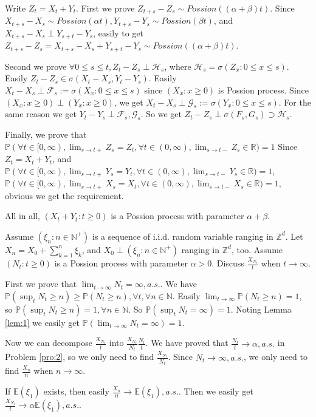 \documentclass[../main]{subfiles}
\begin{document}
\begin{solution}
  Write \(Z_t=X_t + Y_t\). First we prove \(Z_{t+s}-Z_s \sim Possion((\alpha + \beta)t)\).
  Since \(X_{t + s}-X_s \sim Possion(\alpha t),Y_{t+s}-Y_s \sim Possion(\beta t)\), and \(X_{t + s}-X_s \perp Y_{s + t}-Y_s\), easily to get
  \(Z_{t + s}-Z_{s}=X_{t + s}-X_s+Y_{s + t}-Y_s \sim Possion((\alpha + \beta)t)\).

  Second we prove \(\forall 0 \leq s \leq t,Z_t-Z_s \perp \mathcal{H}_s\), where \(\mathcal{H}_s =\sigma(Z_x:0 \leq x \leq s)\).
  Easily \(Z_t-Z_s \in \sigma(X_t-X_s,Y_t-Y_s)\).
  Easily \(X_t-X_s \perp \mathcal{F}_s:=\sigma(X_x:0 \leq x \leq s)\) since \((X_x:x \geq 0)\) is Possion process.
  Since \((X_x:x \geq 0)\perp (Y_x:x \geq 0)\), we get \(X_t-X_s \perp \mathcal{G}_s:=\sigma(Y_x:0 \leq x \leq s)\).
  For the same reason we get \(Y_t-Y_s \perp \mathcal{F}_s,\mathcal{G}_s\).
  So we get \(Z_t-Z_s \perp \sigma(F_s,G_s) \supset \mathcal{H}_s\).

  Finally, we prove that \(\mathbb{P}(\forall t \in [0,\infty),\lim_{s \to t+}Z_s =Z_t,\forall t \in (0,\infty),\lim_{s \to t-}Z_s \in \mathbb{R})=1\)
  Since \(Z_t=X_t + Y_t\), and
  \(\mathbb{P}(\forall t \in [0,\infty),\lim_{s \to t+}Y_s =Y_t,\forall t \in (0,\infty),\lim_{s \to t-}Y_s \in \mathbb{R})=1\),
  \(\mathbb{P}(\forall t \in [0,\infty),\lim_{s \to t+}X_s =X_t,\forall t \in (0,\infty),\lim_{s \to t-}X_s \in \mathbb{R})=1\),
  obvious we get the requirement.

  All in all, \((X_t + Y_t:t \geq 0)\) is a Possion process with parameter \(\alpha + \beta\).
\end{solution}
\begin{problem}\label{pro:5}
  Assume \((\xi_n:n \in \mathbb{N}^+)\) is a sequence of i.i.d. random variable ranging in \(\mathbb{Z}^d\).
  Let \(X_n=X_0 + \sum_{k=1}^{n}\xi_k\), and \(X_0 \perp (\xi_n:n \in \mathbb{N}^+)\) ranging in \(\mathbb{Z}^d\), too.
  Assume \((N_t:t \geq 0)\) is a Possion process with parameter \(\alpha>0\).
  Discuss \(\frac{X_{N_t}}{t}\) when \(t \to \infty\).
\end{problem}
\begin{solution}
  First we prove that \(\lim_{t \to \infty}N_t=\infty,a. s.\).
  We have \(\mathbb{P}(\sup_{t}N_t \geq n)\geq \mathbb{P}(N_t \geq n),\forall t ,\forall n \in \mathbb{N}\).
  Easily \(\lim_{t \to \infty}\mathbb{P}(N_t \geq n)=1\), so \(\mathbb{P}(\sup_{t}N_t \geq n)=1,\forall n \in \mathbb{N}\).
  So \(\mathbb{P}(\sup_{t}N_t=\infty)=1\).
  Noting Lemma \ref{lem:1} we easily get \(\mathbb{P}(\lim_{t \to \infty}N_t = \infty)=1\).

  Now we can decompose \(\frac{X_{N_t}}{t}\) into \(\frac{X_{N_t}}{N_t} \frac{N_t}{t}\).
  We have proved that \(\frac{N_t}{t} \to \alpha,a. s.\) in Problem \ref{pro:2}, so we only need to find \(\frac{X_{N_t}}{N_t}\).
  Since \(N_t \to \infty,a. s.\), we only need to find \(\frac{X_n}{n}\) when \(n \to \infty\).

  If \(\mathbb{E}(\xi_1)\) exists, then easily \(\frac{X_n}{n} \to \mathbb{E}(\xi_1),a. s.\).
  Then we easily get \(\frac{X_{N_t}}{t} \to \alpha \mathbb{E}(\xi_1),a. s.\).
\end{solution}
\end{document}
